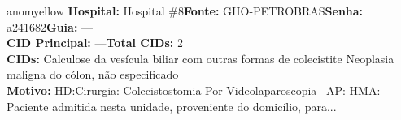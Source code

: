 \documentclass[a4paper,10pt]{article}
\begin{document}
\begin{anomalycard}[Interna\c{c}\~{a}o \#167334 | Pac. \#24848 | MODERADO (z=2.87) | LOS: 1d | 03/03/2026\,$\to$\,04/03/2026]{anomyellow}
\textbf{Hospital:} Hospital \#8\quad \textbf{Fonte:} GHO-PETROBRAS\quad \textbf{Senha:} a241682\quad \textbf{Guia:} ---\\

\textbf{CID Principal:} {\small ---}\quad\textbf{Total CIDs:} 2\\

\textbf{CIDs:} {\scriptsize Calculose da vesícula biliar com outras formas de colecistite \textbar{} Neoplasia maligna do cólon, não especificado}\\

\textbf{Motivo:} {\scriptsize HD:Cirurgia: Colecistostomia Por Videolaparoscopia   AP:  HMA: Paciente admitida nesta unidade, proveniente do domicílio, para...}\\



\end{anomalycard}
\end{document}
